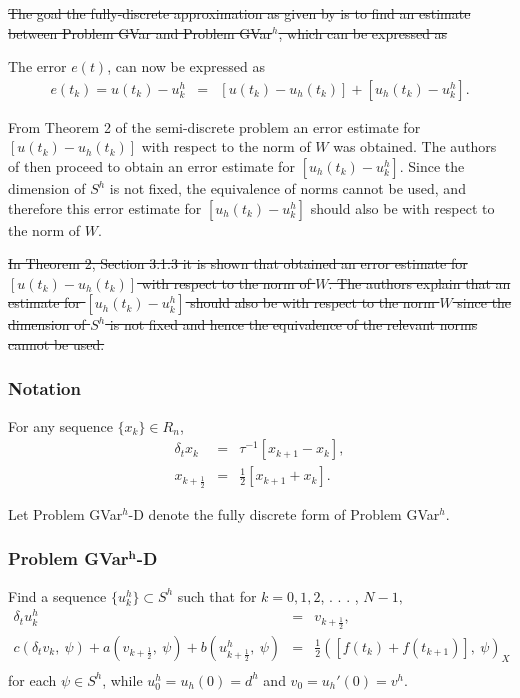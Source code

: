 \documentclass[../../main.tex]{subfiles}
\begin{document}
\sout{The goal the fully-discrete approximation as given by \cite{BV13} is to find an estimate between Problem GVar and Problem GVar$^h$, which can be expressed as}

The error $e(t)$, can now be expressed as
\begin{eqnarray}
	e(t_k) = u(t_k) - u^h_k & = & [u(t_k)-u_h(t_k)] + [u_h(t_k) - u^h_k]. \label{error_e}
\end{eqnarray}


From Theorem 2 of the semi-discrete problem an error estimate for $[u(t_k)-u_h(t_k)]$ with respect to the norm of $W$ was obtained. The authors of \cite{BV13} then proceed to obtain an error estimate for $[u_h(t_k) - u^h_k]$. Since the dimension of $S^h$ is not fixed, the equivalence of norms cannot be used, and therefore this error estimate for $[u_h(t_k) - u^h_k]$ should also be with respect to the norm of $W$.

\sout{In Theorem 2, Section 3.1.3 it is shown that \cite{BV13} obtained an error estimate for $[u(t_k)-u_h(t_k)]$ with respect to the norm of $W$. The authors explain that an estimate for $[u_h(t_k) - u^h_k]$ should also be with respect to the norm $W$ since the dimension of $S^h$ is not fixed and hence the equivalence of the relevant norms cannot be used.}\\

\subsubsection{Notation}
For any sequence $\{x_k\} \in R_n$,
\begin{eqnarray*}
	\delta_{t}x_{k}& = &\tau^{-1}[x_{k+1}-x_{k}],\\
	x_{k+\frac{1}{2}} & = & \frac{1}{2}[x_{k+1}+x_{k}].
\end{eqnarray*}

Let Problem GVar$^h$-D denote the fully discrete form of Problem GVar$^h$.
\subsubsection*{Problem GVar$^\mathbf{{h}}$-D}
Find a sequence $\{u_{k}^{h}\}\subset S^{h}$ such that for $k=0,1,2$, . . . , $N-1,$
\begin{eqnarray}
	\delta_{t}u_{k}^{h}\ & = & v_{k+\frac{1}{2}},\\
	c(\delta_{t}v_{k},\ \psi)+a(v_{k+\frac{1}{2}},\ \psi)+b(u_{k+\frac{1}{2}}^{h},\ \psi) & = & \frac{1}{2}([f(t_{k})+f(t_{k+1})],\ \psi)_{X} \nonumber \\ \label{PP}
\end{eqnarray}
for each $\psi\in S^{h}$, while $u_{0}^{h}=u_{h}(0)=d^{h}$ and $v_{0}=u_{h}'(0)=v^{h}$.\\
\end{document}
